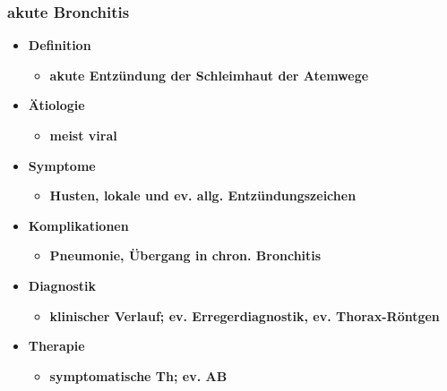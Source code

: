 		\subsubsection{akute Bronchitis}
			\begin{itemize}
				\item \textbf{Definition}
					\begin{itemize}
						\item \textbf{akute Entzündung der Schleimhaut der Atemwege}
					\end{itemize}
				\item \textbf{Ätiologie}
					\begin{itemize}
						\item \textbf{meist viral}
					\end{itemize}
				\item \textbf{Symptome}
					\begin{itemize}
						\item \textbf{Husten, lokale und ev. allg. Entzündungszeichen}
					\end{itemize}
				\item \textbf{Komplikationen}
					\begin{itemize}
						\item \textbf{Pneumonie, Übergang in chron. Bronchitis}
					\end{itemize}
				\item \textbf{Diagnostik}
					\begin{itemize}
						\item \textbf{klinischer Verlauf; ev. Erregerdiagnostik, ev. Thorax-Röntgen}
					\end{itemize}
				\item \textbf{Therapie}
					\begin{itemize}
						\item \textbf{symptomatische Th; ev. AB}
					\end{itemize}
			\end{itemize}
